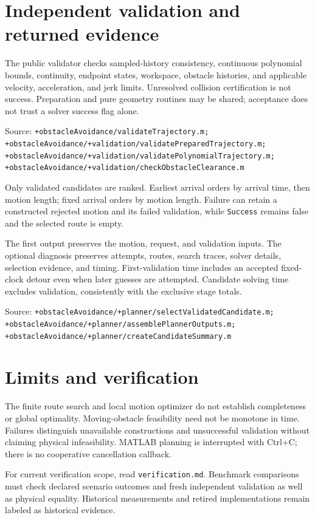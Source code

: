 \documentclass[10pt,letterpaper]{article}
\newcommand{\source}[1]{\par{\footnotesize Source: \nolinkurl{#1}}\par}
\begin{document}
\section{Independent validation and returned evidence}

The public validator checks sampled-history consistency, continuous polynomial
bounds, continuity, endpoint states, workspace, obstacle histories, and applicable
velocity, acceleration, and jerk limits. Unresolved collision certification is
not success. Preparation and pure geometry routines may be shared; acceptance
does not trust a solver success flag alone.
\source{+obstacleAvoidance/validateTrajectory.m; +obstacleAvoidance/+validation/validatePreparedTrajectory.m; +obstacleAvoidance/+validation/validatePolynomialTrajectory.m; +obstacleAvoidance/+validation/checkObstacleClearance.m}

Only validated candidates are ranked. Earliest arrival orders by arrival time,
then motion length; fixed arrival orders by motion length. Failure can retain a
constructed rejected motion and its failed validation, while \texttt{Success}
remains false and the selected route is empty.

The first output preserves the motion, request, and validation inputs.
The optional diagnosis preserves attempts, routes, search traces, solver details,
selection evidence, and timing. First-validation time includes an accepted
fixed-clock detour even when later guesses are attempted. Candidate solving time
excludes validation, consistently with the exclusive stage totals.
\source{+obstacleAvoidance/+planner/selectValidatedCandidate.m; +obstacleAvoidance/+planner/assemblePlannerOutputs.m; +obstacleAvoidance/+planner/createCandidateSummary.m}

\section{Limits and verification}

The finite route search and local motion optimizer do not establish completeness
or global optimality. Moving-obstacle feasibility need not be monotone in time.
Failures distinguish unavailable constructions and unsuccessful validation without
claiming physical infeasibility. MATLAB planning is interrupted with Ctrl+C;
there is no cooperative cancellation callback.

For current verification scope, read \texttt{verification.md}. Benchmark comparisons
must check declared scenario outcomes and fresh independent validation as well as
physical equality. Historical measurements and retired implementations remain
labeled as historical evidence.
\end{document}
